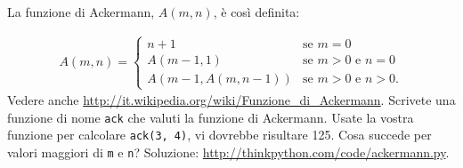 \documentclass[10pt]{book}
\begin{document}
\vspace{0.2in}
\begin{exercise}
\label{ackermann}

La funzione di Ackermann, $A(m, n)$, è così definita:

\begin{eqnarray*}
A(m, n) = \begin{cases} 
              n+1 & \mbox{se } m = 0 \\ 
        A(m-1, 1) & \mbox{se } m > 0 \mbox{ e } n = 0 \\ 
A(m-1, A(m, n-1)) & \mbox{se } m > 0 \mbox{ e } n > 0.
\end{cases} 
\end{eqnarray*}
%
Vedere anche \url{http://it.wikipedia.org/wiki/Funzione_di_Ackermann}.
Scrivete una funzione di nome {\tt ack} che valuti la funzione di Ackermann.
Usate la vostra funzione per calcolare {\tt ack(3, 4)}, vi dovrebbe risultare 125.
Cosa succede per valori maggiori di {\tt m} e {\tt n}?
Soluzione: \url{http://thinkpython.com/code/ackermann.py}.

\end{exercise}
\end{document}
